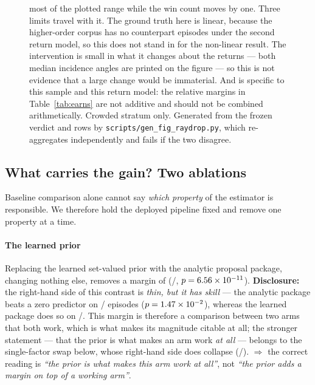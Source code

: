 \documentclass[review]{elsarticle}
\begin{document}
\begin{figure}[!htbp]
{most of the plotted range while the win count moves by one.
Three limits travel with it. The ground truth here is linear, because the
higher-order corpus has no counterpart episodes under the second return model, so
this does not stand in for the non-linear result. The intervention is small in what
it changes about the returns --- both median incidence angles are printed on the
figure --- so this is not evidence that a large change would be immaterial. And
\BFifteenRel{} is specific to this sample and this return model: the relative
margins in Table~\ref{tab:earns} are not additive and should not be combined
arithmetically. Crowded stratum only. Generated from the frozen verdict and rows by
\texttt{scripts/gen\_fig\_raydrop.py}, which re-aggregates independently and fails
if the two disagree.}
\label{fig:raydrop}
\end{figure}

\subsection{What carries the gain? Two ablations}
\label{sec:res_ablation}

Baseline comparison alone cannot say \emph{which property} of the estimator is
responsible. We therefore hold the deployed pipeline fixed and remove one property
at a time.

\paragraph{The learned prior}
Replacing the learned set-valued prior with the analytic proposal package, changing
nothing else, removes a margin of \BTwentyTwoRel{} (\BTwentyTwoBetter{}/\BTwentyTwoN{},
$p = 6.56\times 10^{-11}{}$).
\textbf{Disclosure:} the right-hand side of this contrast is \emph{thin, but it has
skill} --- the analytic package beats a zero predictor on
\BTwentyTwoAnaShipZero{}/\BTwentyTwoN{} episodes ($p = 1.47\times 10^{-2}{}$),
whereas the learned package does so on \BTwentyTwoLearnZero{}/\BTwentyTwoN{}.
This margin is therefore a comparison between two arms that both work, which is what
makes its magnitude citable at all; the stronger statement --- that the prior is what
makes an arm work \emph{at all} --- belongs to the single-factor swap below, whose
right-hand side does collapse (\BTwentyTwoAnaZero{}/\BTwentyTwoN{}).
$\Rightarrow$ the correct reading is \emph{``the prior is what makes this arm work at all''},
not \emph{``the prior adds a margin on top of a working arm''}.
\end{document}
